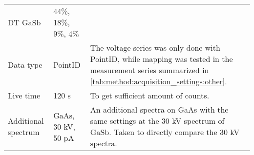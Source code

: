 \begin{table}[phtb]
\begin{center}
\begin{tabular}{p{2cm}p{3cm}p{8.6cm}}
            DT GaSb             & 44\%, 18\%, 9\%, 4\% &                                                                                                                                                                                                                                                                \\
            Data type           & PointID              & The voltage series was only done with PointID, while mapping was tested in the measurement series summarized in \cref{tab:method:acquisition_settings:other}.                                                                                                  \\
            Live time           & 120 s                & To get sufficient amount of counts.                                                                                                                                                                                                                            \\
            Additional spectrum & GaAs, 30 kV, 50 pA   & An additional spectra on GaAs with the same settings at the 30 kV spectrum of GaSb. Taken to directly compare the 30 kV spectra.                                                                                                                               \\

            \hline
        \end{tabular}
    \end{center}
\end{table}
